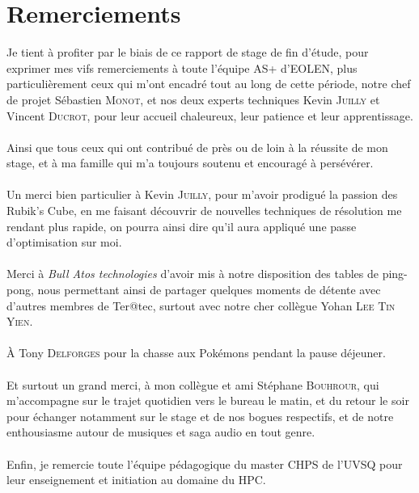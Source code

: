 \part*{Remerciements}
\sloppy
Je tient à profiter par le biais de ce rapport de stage de fin d'étude, pour
exprimer mes vifs remerciements à toute l'équipe AS+ d'EOLEN, plus
particulièrement ceux qui m'ont encadré tout au long de cette période, notre
chef de projet Sébastien \textsc{Monot}, et nos deux experts techniques Kevin
\textsc{Juilly} et Vincent \textsc{Ducrot}, pour leur accueil chaleureux, leur
patience et leur apprentissage.
\\
\\
Ainsi que tous ceux qui ont contribué de près ou de loin à la réussite de mon
stage, et à ma famille qui m'a toujours soutenu et encouragé à persévérer.
\\
\\
Un merci bien particulier à Kevin \textsc{Juilly}, pour m'avoir prodigué la
passion des Rubik's Cube, en me faisant découvrir de nouvelles techniques de
résolution me rendant plus rapide, on pourra ainsi dire qu'il aura appliqué une
passe d'optimisation sur moi.
\\
\\
Merci à \emph{Bull Atos technologies} d'avoir mis à notre disposition des tables
de ping-pong, nous permettant ainsi de partager quelques moments de détente avec
d'autres membres de Ter@tec, surtout avec notre cher collègue Yohan \textsc{Lee
Tin Yien}.
\\
\\
À Tony \textsc{Delforges} pour la chasse aux Pokémons pendant la pause déjeuner.
\\
\\
Et surtout un grand merci, à mon collègue et ami Stéphane \textsc{Bouhrour}, qui
m'accompagne sur le trajet quotidien vers le bureau le matin, et du retour le
soir pour échanger notamment sur le stage et de nos bogues respectifs, et de
notre enthousiasme autour de musiques et saga audio en tout genre.
\\
\\
Enfin, je remercie toute l'équipe pédagogique du master CHPS de l'UVSQ pour leur
enseignement et initiation au domaine du HPC.
